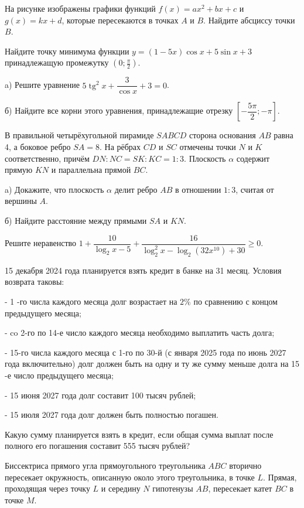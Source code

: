  На рисунке изображены графики функций $f(x)=a x^2+b x+c$ и $g(x)=k x+d$, которые пересекаются в точках $A$ и $B$. Найдите абсциссу точки $B$.

 Найдите точку минимума функции  $y=(1-5 x) \cos x+5 \sin x+3$  принадлежащую промежутку $\left(0 ; \frac{\pi}{2}\right)$. 


a) Решите уравнение $5 \operatorname{tg}^2 x+\dfrac{3}{\cos x}+3=0$.

б) Найдите все корни этого уравнения, принадлежащие отрезку $\left[-\dfrac{5 \pi}{2} ;-\pi\right]$.

 В правильной четырёхугольной пирамиде $S A B C D$ сторона основания $A B$ равна 4, а боковое ребро $S A=8$. На рёбрах $C D$ и $S C$ отмечены точки $N$ и $K$ соответственно, причём $D N: N C=S K: K C=1: 3$. Плоскость $\alpha$ содержит прямую $K N$ и параллельна прямой $B C$.

a) Докажите, что плоскость $\alpha$ делит ребро $A B$ в отношении $1: 3$, считая от вершины $A$.

б) Найдите расстояние между прямыми $S A$ и $K N$.

 Решите неравенство $1+\dfrac{10}{\log _2 x-5}+\dfrac{16}{\log _2^2 x-\log _2\left(32 x^{10}\right)+30} \geqslant 0$.

\newpage

 15 декабря 2024 года планируется взять кредит в банке на 31 месяц. Условия возврата таковы:

- 1 -го числа каждого месяца долг возрастает на $2 \%$ по сравнению с концом предыдущего месяца;

- co 2-го по 14-е число каждого месяца необходимо выплатить часть долга;

- 15-го числа каждого месяца с 1-го по 30-й (с января 2025 года по июнь 2027 года включительно) долг должен быть на одну и ту же сумму меньше долга на 15 -е число предыдущего месяца;

- 15 июня 2027 года долг составит 100 тысяч рублей;

- 15 июля 2027 года долг должен быть полностью погашен.

Какую сумму планируется взять в кредит, если общая сумма выплат после полного его погашения составит 555 тысяч рублей?

 Биссектриса прямого угла прямоугольного треугольника $A B C$ вторично пересекает окружность, описанную около этого треугольника, в точке $L$. Прямая, проходящая через точку $L$ и середину $N$ гипотенузы $A B$, пересекает катет $B C$ в точке $M$.

